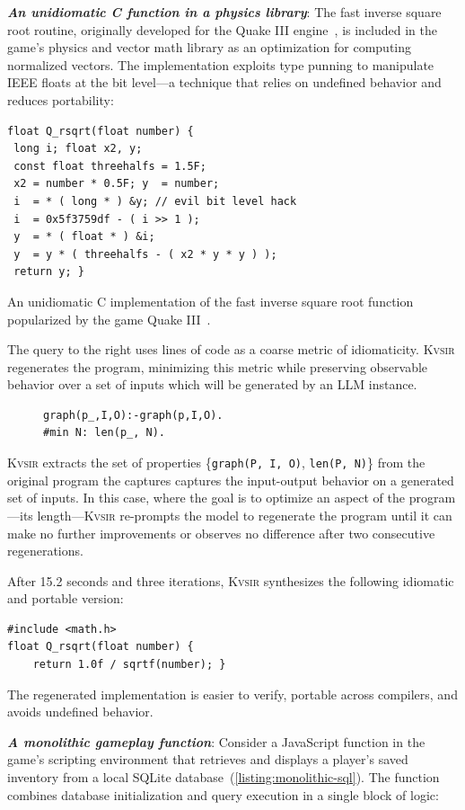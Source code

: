 \documentclass[sigplan,review,anonymous,10pt]{acmart}
\newcommand{\sys}{{\scshape Kv{\textalpha}sir}\xspace}
\newcommand{\heading}[1]{\vspace{2pt}\noindent\textbf{\emph{#1}}:\enspace}
\newcommand{\prop}[1]{\setlength{\fboxsep}{1.75pt}\colorbox{lightperiwinkle}{\texttt{#1}}}
\begin{document}
\heading{An unidiomatic C function in a physics library}
The fast inverse square root routine, originally developed for the Quake III
engine~\cite{fast_inv_sqrt}, is included in the game's physics and vector math
library as an optimization for computing normalized vectors.
The implementation
exploits type punning to manipulate IEEE floats at the bit level—a technique
that relies on undefined behavior and reduces portability:
\begin{listing}
\begin{verbatim}
float Q_rsqrt(float number) {
 long i; float x2, y;
 const float threehalfs = 1.5F;
 x2 = number * 0.5F; y  = number;
 i  = * ( long * ) &y; // evil bit level hack
 i  = 0x5f3759df - ( i >> 1 );
 y  = * ( float * ) &i;
 y  = y * ( threehalfs - ( x2 * y * y ) );
 return y; }
\end{verbatim}
\caption{An unidiomatic C implementation of the fast inverse square root function popularized by the game Quake III~\cite{fast_inv_sqrt}.}
\end{listing}
The query to the right uses lines of code as a coarse metric of
idiomaticity. \sys regenerates the program, minimizing this metric while
preserving observable behavior over a set of inputs which will be generated by an LLM instance.
\begin{figure}
\begin{verbatim}
graph(p_,I,O):-graph(p,I,O).
#min N: len(p_, N).
\end{verbatim}
\end{figure}
\sys extracts the set of properties \{\prop{graph(P, I, O)}, \prop{len(P, N)}\}
from the original program
the captures captures the input-output behavior on a generated set of
inputs.
In this case, where the goal is to optimize an aspect of the program---its length---\sys
re-prompts the model to regenerate the program until it can make no further
improvements or observes no difference after two consecutive regenerations.

After 15.2 seconds and three iterations, \sys synthesizes the following idiomatic and portable version:
\begin{verbatim}
#include <math.h>
float Q_rsqrt(float number) {
    return 1.0f / sqrtf(number); }
\end{verbatim}
The regenerated implementation is easier to verify, portable across compilers, and avoids undefined behavior.

\heading{A monolithic gameplay function}
Consider a JavaScript function in the game's scripting environment that
retrieves and displays a player's saved inventory from a local SQLite database~(\cref{listing:monolithic-sql}).
The function combines database initialization and query execution in a single
block of logic:
\end{document}
